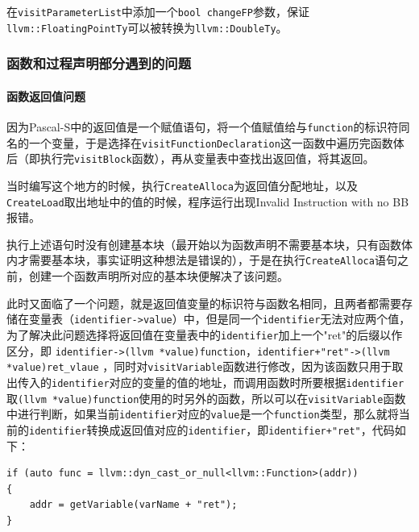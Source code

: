 \documentclass[lang=cn,11pt,a4paper,cite=authornum]{paper}
\begin{document}
在\texttt{visitParameterList}中添加一个\texttt{bool changeFP}参数，保证\texttt{llvm::FloatingPointTy}可以被转换为\texttt{llvm::DoubleTy}。

\subsubsection{函数和过程声明部分遇到的问题}

\paragraph{函数返回值问题}

因为Pascal-S中的返回值是一个赋值语句，将一个值赋值给与\texttt{function}的标识符同名的一个变量，于是选择在\texttt{visitFunctionDeclaration}这一函数中遍历完函数体后（即执行完\texttt{visitBlock}函数），再从变量表中查找出返回值，将其返回。

当时编写这个地方的时候，执行\texttt{CreateAlloca}为返回值分配地址，以及\texttt{CreateLoad}取出地址中的值的时候，程序运行出现Invalid Instruction with no BB报错。

执行上述语句时没有创建基本块（最开始以为函数声明不需要基本块，只有函数体内才需要基本块，事实证明这种想法是错误的），于是在执行\texttt{CreateAlloca}语句之前，创建一个函数声明所对应的基本块便解决了该问题。

​此时又面临了一个问题，就是返回值变量的标识符与函数名相同，且两者都需要存储在变量表（\texttt{identifier->value}）中，但是同一个\texttt{identifier}无法对应两个值，为了解决此问题选择将返回值在变量表中的\texttt{identifier}加上一个"ret"的后缀以作区分，即 \texttt{identifier->(llvm *value)function}，\texttt{identifier+"ret"->(llvm *value)ret_vlaue} ，同时对\texttt{visitVariable}函数进行修改，因为该函数只用于取出传入的\texttt{identifier}对应的变量的值的地址，而调用函数时所要根据\texttt{identifier}取\texttt{(llvm *value)function}使用的时另外的函数，所以可以在\texttt{visitVariable}函数中进行判断，如果当前\texttt{identifier}对应的\texttt{value}是一个\texttt{function}类型，那么就将当前的\texttt{identifier}转换成返回值对应的\texttt{identifier}，即\texttt{identifier+"ret"}，代码如下：

\begin{code}
    \begin{verbatim}
if (auto func = llvm::dyn_cast_or_null<llvm::Function>(addr))
{
    addr = getVariable(varName + "ret");
}
\end{verbatim}
\end{code}
\end{document}
